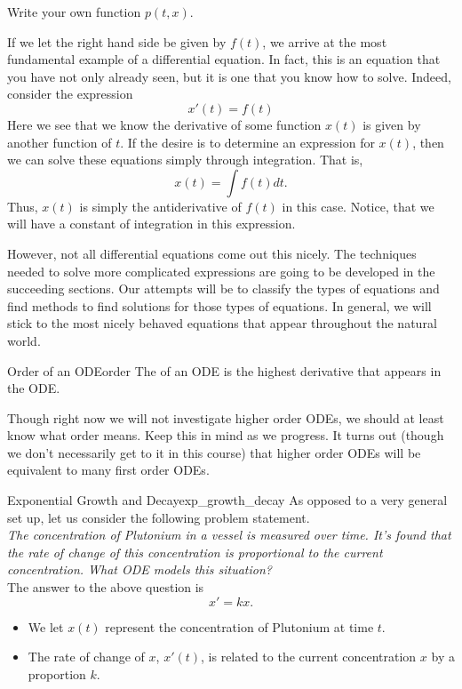         \begin{exercise}
        Write your own function $p(t,x)$.
        \end{exercise}

        If we let the right hand side be given by $f(t)$, we arrive at the most fundamental example of a differential equation. In fact, this is an equation that you have not only already seen, but it is one that you know how to solve.  Indeed, consider the expression
        \[
            x'(t) = f(t)
        \]
        Here we see that we know the derivative of some function $x(t)$ is given by another function of $t$.  If the desire is to determine an expression for $x(t)$, then we can solve these equations simply through integration. That is,
        \[
            x(t) = \int f(t) dt.
        \]
        Thus, $x(t)$ is simply the antiderivative of $f(t)$ in this case.  Notice, that we will have a constant of integration in this expression.

        However, not all differential equations come out this nicely. The techniques needed to solve more complicated expressions are going to be developed in the succeeding sections.  Our attempts will be to classify the types of equations and find methods to find solutions for those types of equations. In general, we will stick to the most nicely behaved equations that appear throughout the natural world.


        \begin{df}{Order of an ODE}{order}
        The   of an ODE is the highest derivative that appears in the ODE.
        \end{df}

        \noindent Though right now we will not investigate higher order ODEs, we should at least know what order means.  Keep this in mind as we progress.  It turns out (though we don't necessarily get to it in this course) that higher order ODEs will be equivalent to many first order ODEs.

        \begin{ex}{Exponential Growth and Decay}{exp_growth_decay}
        As opposed to a very general set up, let us consider the following problem statement.\\

        \emph{The concentration of Plutonium in a vessel is measured over time.  It's found that the rate of change of this concentration is proportional to the current concentration.  What ODE models this situation?}\\

        The answer to the above question is
        \[
        x'=kx.
        \]
        \begin{itemize}
            \item We let $x(t)$ represent the concentration of Plutonium at time $t$.
            \item The rate of change of $x$, $x'(t)$, is related to the current concentration $x$ by a proportion $k$.
        \end{itemize}
        \end{ex}

